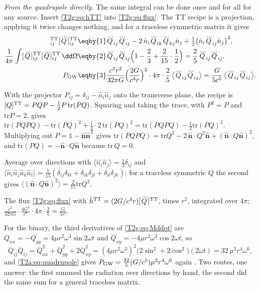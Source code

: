 \emph{From the quadrupole directly.} The same integral can be done once and for all for any source. Insert \eqref{T2g:eq:hTT} into \eqref{T2g:eq:flux}. The TT recipe is a projection, applying it twice changes nothing, and for a traceless symmetric matrix it gives
\begin{align}
  [\dddot Q]^{\rm TT}_{ij}[\dddot Q]^{\rm TT}_{ij}
  &\eqby{1}\dddot Q_{ij}\dddot Q_{ij}-2\,\hat n_i\dddot Q_{ik}\dddot Q_{kj}\hat n_j+\tfrac12\big(\hat n_i\dddot Q_{ij}\hat n_j\big)^2,\nonumber\\
  \frac{1}{4\pi}\int[\dddot Q]^{\rm TT}_{ij}[\dddot Q]^{\rm TT}_{ij}\,\dd\Omega
  &\eqby{2}\dddot Q_{ij}\dddot Q_{ij}\Big(1-\frac23+\frac{2}{15}\cdot\frac12\Big)
  =\frac25\,\dddot Q_{ij}\dddot Q_{ij},\nonumber\\
  P_{\rm GW}
  &\eqby{3}\frac{c^3r^2}{32\pi G}\Big(\frac{2G}{c^4r}\Big)^2\cdot4\pi\cdot\frac25\,\big\langle\dddot Q_{ij}\dddot Q_{ij}\big\rangle
  =\frac{G}{5c^5}\,\big\langle\dddot Q_{ij}\dddot Q_{ij}\big\rangle .
  \label{T2a:eq:quadrupole}
\end{align}
\begin{explain}
  \item With the projector $P_{ij}=\delta_{ij}-\hat n_i\hat n_j$ onto the transverse plane, the recipe is $[Q]^{\rm TT}=PQP-\tfrac12P\,\mathrm{tr}(PQ)$. Squaring and taking the trace, with $P^2=P$ and $\mathrm{tr}P=2$, gives $\mathrm{tr}(PQPQ)-\mathrm{tr}(PQ)^2+\tfrac14\cdot2\,\mathrm{tr}(PQ)^2=\mathrm{tr}(PQPQ)-\tfrac12\mathrm{tr}(PQ)^2$. Multiplying out $P=\mathbb 1-\hat{\bm n}\hat{\bm n}^{\mathsf T}$ gives $\mathrm{tr}(PQPQ)=\mathrm{tr}Q^2-2\,\hat{\bm n}\cdot Q^2\hat{\bm n}+(\hat{\bm n}\cdot Q\hat{\bm n})^2$, and $\mathrm{tr}(PQ)=-\hat{\bm n}\cdot Q\hat{\bm n}$ because $\mathrm{tr}\,Q=0$.
  \item Average over directions with $\langle\hat n_i\hat n_j\rangle=\tfrac13\delta_{ij}$ and $\langle\hat n_i\hat n_j\hat n_k\hat n_l\rangle=\tfrac1{15}(\delta_{ij}\delta_{kl}+\delta_{ik}\delta_{jl}+\delta_{il}\delta_{jk})$; for a traceless symmetric $Q$ the second gives $\langle(\hat{\bm n}\cdot Q\hat{\bm n})^2\rangle=\tfrac{2}{15}\mathrm{tr}Q^2$.
  \item The flux \eqref{T2g:eq:flux} with $\dot h^{\rm TT}=(2G/c^4r)[\dddot Q]^{\rm TT}$, times $r^2$, integrated over $4\pi$; $\frac{c^3}{32\pi G}\cdot\frac{4G^2}{c^8}\cdot4\pi\cdot\frac25=\frac{G}{5c^5}$.
\end{explain}
For the binary, the third derivatives of \eqref{T2g:eq:Mddot} are $\dddot Q_{xx}=-\dddot Q_{yy}=4\mu r^2\omega^3\sin2\omega t$ and $\dddot Q_{xy}=-4\mu r^2\omega^3\cos2\omega t$, so
\begin{equation}
  \dddot Q_{ij}\dddot Q_{ij}=\dddot Q_{xx}^2+\dddot Q_{yy}^2+2\dddot Q_{xy}^2=(4\mu r^2\omega^3)^2\big(2\sin^2+2\cos^2\big)(2\omega t)=32\,\mu^2r^4\omega^6 ,
  \label{T2a:eq:Qddd}
\end{equation}
and \eqref{T2a:eq:quadrupole} gives $P_{\rm GW}=\tfrac{32}{5}(G/c^5)\mu^2r^4\omega^6$ again \cite[Sec.~4.1]{Maggiore2007}. Two routes, one answer: the first summed the radiation over directions by hand, the second did the same sum for a general traceless matrix.

